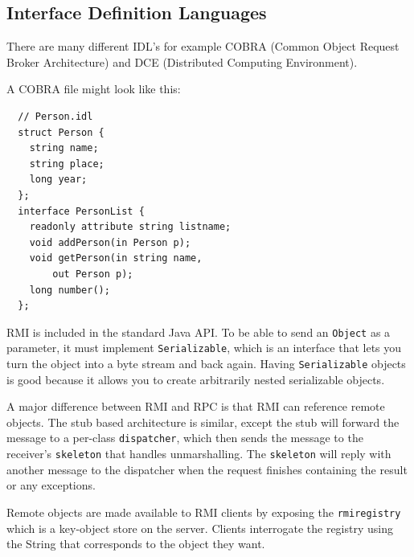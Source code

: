 \subsection{Interface Definition Languages}

There are many different IDL's for example COBRA (Common Object Request Broker
Architecture) and DCE (Distributed Computing Environment).

A COBRA file might look like this:

\begin{lstlisting}
  // Person.idl
  struct Person {
    string name; 
    string place;
    long year;
  };
  interface PersonList {
    readonly attribute string listname;
    void addPerson(in Person p);
    void getPerson(in string name, 
        out Person p);
    long number();
  };
\end{lstlisting}

RMI is included in the standard Java API. To be able to send an \texttt{Object}
as a parameter, it must implement \texttt{Serializable}, which is an interface
that lets you turn the object into a byte stream and back again. Having
\texttt{Serializable} objects is good because it allows you to create
arbitrarily nested serializable objects.

A major difference between RMI and RPC is that RMI can reference remote objects.
The stub based architecture is similar, except the stub will forward the message
to a per-class \texttt{dispatcher}, which then sends the message to the
receiver's \texttt{skeleton} that handles unmarshalling. The \texttt{skeleton}
will reply with another message to the dispatcher when the request finishes
containing the result or any exceptions.

Remote objects are made available to RMI clients by exposing the
\texttt{rmiregistry} which is a key-object store on the server. Clients
interrogate the registry using the String that corresponds to the object they
want.
